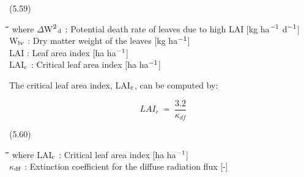  
\strut\hfill (5.59)

\nwln
\begin{tabbing}
\hspace{1.27cm}\=\hspace{1.27cm}\=\hspace{1.27cm}\=\hspace{1.27cm}\=%
\hspace{1.27cm}\=\hspace{1.27cm}\=\hspace{1.27cm}\=\hspace{1.27cm}\=%
\hspace{1.27cm}\=\hspace{1.27cm}\=\kill
where $\Delta$W$^{{\rm 2}}$$_{{\rm d}}$ : Potential death rate of leaves due to high LAI        [kg ha$^{{\rm -1}}$ d$^{{\rm -1}}$]\\
W$_{{\rm lv}}$ : Dry matter weight of the leaves        [kg ha$^{{\rm -1}}$]\\
LAI : Leaf area index        [ha ha$^{{\rm -1}}$]\\
LAI$_{{\rm c}}$ : Critical leaf area index        [ha ha$^{{\rm -1}}$]
\end{tabbing}



The critical leaf area index, LAI$_{{\rm c}}$,  can be computed by:

\begin{displaymath}
LAI _{c} ~=~{\frac{3.2}{\kappa  _{df} }}
\end{displaymath}

 
\strut\hfill (5.60)

\nwln
\begin{tabbing}
\hspace{1.27cm}\=\hspace{1.27cm}\=\hspace{1.27cm}\=\hspace{1.27cm}\=%
\hspace{1.27cm}\=\hspace{1.27cm}\=\hspace{1.27cm}\=\hspace{1.27cm}\=%
\hspace{1.27cm}\=\hspace{1.27cm}\=\kill
where LAI$_{{\rm c}}$ : Critical leaf area index        [ha ha$^{{\rm -1}}$]\\
$\kappa$$_{{\rm df}}$ : Extinction coefficient for the diffuse radiation flux        [-]
\end{tabbing}



